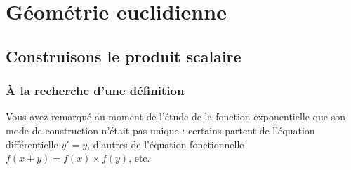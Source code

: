 \documentclass[french]{book}
\newcommand{\fr}[2]{\dfrac{#1}{#2}}
\begin{document}

\chapter{Géométrie euclidienne} 




\section{Construisons le produit scalaire}\label{ps}

\subsection{À la recherche d'une définition}

Vous avez remarqué au moment de l'étude de la fonction exponentielle que
son  mode de  construction  n'était  pas unique  :  certains partent  de
l'équation différentielle  $y'=y$, d'autres de  l'équation fonctionnelle
$f(x+y)=f(x)\times f(y)$, etc.

\end{document}
